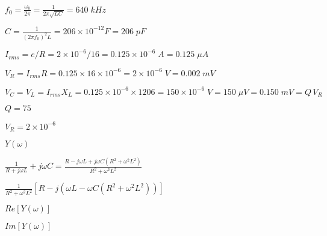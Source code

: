 \documentclass{article}
\def\lthtmlcheckvsize{\ifdim\ht\sizebox<\vsize 
  \ifdim\wd\sizebox<\hsize\expandafter\hfill\fi \expandafter\vfill
  \else\expandafter\vss\fi}%
\begin{document}
{\newpage\clearpage
{}%
$\displaystyle f_0=\frac{\omega_0}{2\pi}=\frac{1}{2\pi\sqrt{LC}}=640\;kHz$%
\lthtmlindisplaymathZ
\lthtmlcheckvsize\clearpage}

{\newpage\clearpage
{}%
$\displaystyle C=\frac{1}{(2\pi f_0)^2L}=206\times 10^{-12}F=206\;pF$%
\lthtmlindisplaymathZ
\lthtmlcheckvsize\clearpage}

{\newpage\clearpage
{}%
$\displaystyle I_{rms}=e/R=2\times 10^{-6}/16=0.125\times 10^{-6}\; A =0.125\;\mu A$%
\lthtmlindisplaymathZ
\lthtmlcheckvsize\clearpage}

{\newpage\clearpage
{}%
$\displaystyle V_R=I_{rms} R=0.125\times 16\times 10^{-6}=2\times 10^{-6}\;V=0.002\;mV$%
\lthtmlindisplaymathZ
\lthtmlcheckvsize\clearpage}

{\newpage\clearpage
{}%
$\displaystyle V_C = V_L=I_{rms} X_L=0.125\times 10^{-6}\times 1206=150\times 10^{-6}\;V
=150\;\mu V =0.150\;mV=Q\,V_R$%
\lthtmlindisplaymathZ
\lthtmlcheckvsize\clearpage}

{\newpage\clearpage
{}%
$ Q=75$%
\lthtmlindisplaymathZ
\lthtmlcheckvsize\clearpage}

{\newpage\clearpage
{}%
$ V_R=2\times 10^{-6}$%
\lthtmlindisplaymathZ
\lthtmlcheckvsize\clearpage}

{\newpage\clearpage
{}%
$\displaystyle Y(\omega)$%
\lthtmlindisplaymathZ
\lthtmlcheckvsize\clearpage}

{\newpage\clearpage
{}%
$\displaystyle \frac{1}{R+j\omega L}+j\omega C
=\frac{R-j\omega L+j\omega C(R^2+\omega^2L^2)}{R^2+\omega^2L^2}$%
\lthtmlindisplaymathZ
\lthtmlcheckvsize\clearpage}

{\newpage\clearpage
{}%
$\displaystyle \frac{1}{R^2+\omega^2L^2}[R-j(\omega L-\omega C(R^2+\omega^2L^2))]$%
\lthtmlindisplaymathZ
\lthtmlcheckvsize\clearpage}

{\newpage\clearpage
{}%
$ Re[Y(\omega)]$%
\lthtmlindisplaymathZ
\lthtmlcheckvsize\clearpage}

{\newpage\clearpage
{}%
$ Im[Y(\omega)]$%
\lthtmlindisplaymathZ
\lthtmlcheckvsize\clearpage}
\end{document}
